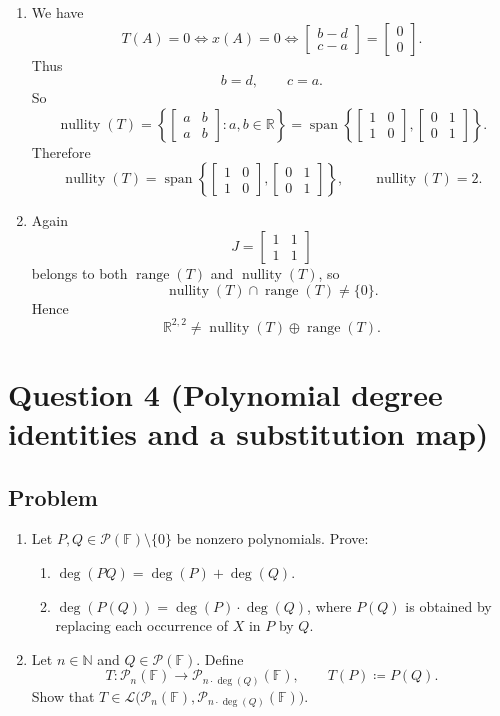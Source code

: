 \documentclass[12pt]{article}
\newcommand{\F}{\mathbb{F}}
\newcommand{\R}{\mathbb{R}}
\newcommand{\cL}{\mathcal{L}}
\newcommand{\cP}{\mathcal{P}}
\DeclareMathOperator{\Range}{range}
\DeclareMathOperator{\Nullity}{nullity}
\DeclareMathOperator{\Null}{nullity}
\begin{document}
\begin{enumerate}[label=(\alph*)]
\item We have
\[
T(A)=0
\iff
x(A)=0
\iff
\begin{bmatrix}
b-d\\
c-a
\end{bmatrix}
=
\begin{bmatrix}0\\0\end{bmatrix}.
\]
Thus
\[
b=d,\qquad c=a.
\]
So
\[
\Null(T)=
\left\{
\begin{bmatrix}a&b\\a&b\end{bmatrix}:a,b\in\R
\right\}
=
\operatorname{span}\left\{
\begin{bmatrix}1&0\\1&0\end{bmatrix},
\begin{bmatrix}0&1\\0&1\end{bmatrix}
\right\}.
\]
Therefore
\[
\boxed{
\Null(T)=
\operatorname{span}\left\{
\begin{bmatrix}1&0\\1&0\end{bmatrix},
\begin{bmatrix}0&1\\0&1\end{bmatrix}
\right\},
\qquad
\Nullity(T)=2.}
\]

\item Again
\[
J=\begin{bmatrix}1&1\\1&1\end{bmatrix}
\]
belongs to both \(\Range(T)\) and \(\Null(T)\), so
\[
\Null(T)\cap \Range(T)\neq \{0\}.
\]
Hence
\[
\boxed{\R^{2,2}\neq \Null(T)\oplus \Range(T).}
\]
\end{enumerate}

\newpage
\section{Question 4 (Polynomial degree identities and a substitution map)}
\subsection{Problem}
\begin{enumerate}[label=(\alph*)]
\item Let \(P,Q\in \cP(\F)\setminus\{0\}\) be nonzero polynomials.
Prove:
\begin{enumerate}[label=(\roman*)]
\item \(\deg(PQ)=\deg(P)+\deg(Q)\).
\item \(\deg(P(Q))=\deg(P)\cdot \deg(Q)\), where \(P(Q)\) is obtained by replacing each occurrence of \(X\) in \(P\) by \(Q\).
\end{enumerate}
\item Let \(n\in\mathbb{N}\) and \(Q\in\cP(\F)\). Define
\[
T:\cP_n(\F)\to \cP_{n\cdot \deg(Q)}(\F),\qquad T(P)\coloneqq P(Q).
\]
Show that \(T\in \cL\bigl(\cP_n(\F),\cP_{n\cdot\deg(Q)}(\F)\bigr)\).
\end{enumerate}
\end{document}
